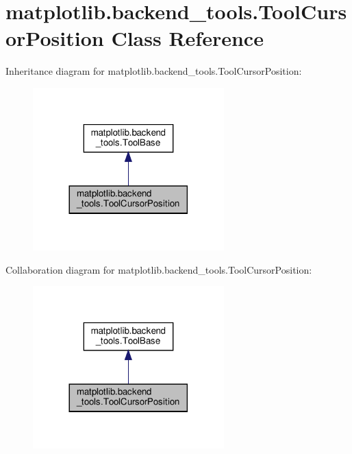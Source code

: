 \hypertarget{classmatplotlib_1_1backend__tools_1_1ToolCursorPosition}{}\section{matplotlib.\+backend\+\_\+tools.\+Tool\+Cursor\+Position Class Reference}
\label{classmatplotlib_1_1backend__tools_1_1ToolCursorPosition}


Inheritance diagram for matplotlib.\+backend\+\_\+tools.\+Tool\+Cursor\+Position\+:
\nopagebreak
\begin{figure}[H]
\begin{center}
\leavevmode
\includegraphics[width=209pt]{classmatplotlib_1_1backend__tools_1_1ToolCursorPosition__inherit__graph}
\end{center}
\end{figure}


Collaboration diagram for matplotlib.\+backend\+\_\+tools.\+Tool\+Cursor\+Position\+:
\nopagebreak
\begin{figure}[H]
\begin{center}
\leavevmode
\includegraphics[width=209pt]{classmatplotlib_1_1backend__tools_1_1ToolCursorPosition__coll__graph}
\end{center}
\end{figure}
